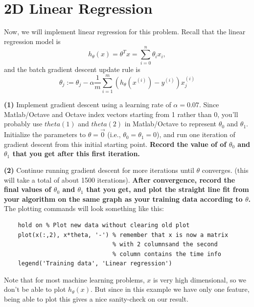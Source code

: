 \documentclass[10pt,a4paper]{article}
\begin{document}
\section{2D Linear Regression}
%
  Now, we will implement linear regression for this problem. Recall that the linear regression model is 
  \begin{displaymath}
    h_{\theta}(x) = \theta^Tx = \sum_{i=0}^n \theta_i x_i, \nonumber
  \end{displaymath}
  and the batch gradient descent update rule is
  \begin{displaymath}
    \theta_j := \theta_j - \alpha \frac{1}{m} \sum_{i=1}^m (h_\theta(x^{(i)}) - y^{(i)}) x^{(i)}_j \nonumber
  \end{displaymath}



  \noindent\textbf{(1)} Implement gradient descent using a learning rate of $\alpha = 0.07$. Since Matlab/Octave and Octave index vectors starting from 1 rather than 0, you'll probably use $theta(1)$ and $theta(2)$ in Matlab/Octave to represent $\theta_0$ and $\theta_1$. Initialize the parameters to  $\theta = \vec{0}$ (i.e.,  $\theta_0=\theta_1=0$), and run one iteration of gradient descent from this initial starting point. \textbf{Record the value of of $\theta_0$ and $\theta_1$ that you get after this first iteration.} 


  \vspace{2ex}
  \noindent\textbf{(2)} Continue running gradient descent for more iterations until $\theta$ converges. (this will take a total of about 1500 iterations). \textbf{After convergence, record the final values of $\theta_0$ and $\theta_1$ that you get, and plot the straight line fit from your algorithm on the same graph as your training data according to $\theta$.} The plotting commands will look something like this:
  \begin{lstlisting}
    hold on % Plot new data without clearing old plot
    plot(x(:,2), x*theta, '-') % remember that x is now a matrix
                               % with 2 columnsand the second 
                               % column contains the time info
    legend('Training data', 'Linear regression')

  \end{lstlisting}
  Note that for most machine learning problems, $x$ is very high dimensional, so we don't be able to plot $h_\theta(x)$. But since in this example we have only one feature, being able to plot this gives a nice sanity-check on our result.
\end{document}
